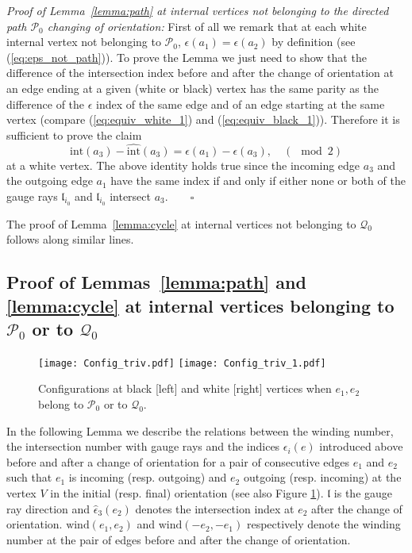 \documentclass[11pt]{amsart}
\theoremstyle{plain}
\numberwithin{equation}{section}
\begin{document}
\smallskip

{\sl Proof of Lemma~\ref{lemma:path} at internal vertices not belonging to the directed path $\mathcal P_0$ changing of orientation: } 
First of all we remark that at each white internal vertex not belonging to $\mathcal P_0$, $\epsilon(a_1)=\epsilon(a_2)$ by definition (see (\ref{eq:eps_not_path})). To prove the Lemma we just need to show that the difference of the intersection index before and after the change of orientation at an edge ending at a given (white or black) vertex has the same parity as the difference of the $\epsilon$ index of the same edge and of an edge starting at the same vertex (compare (\ref{eq:equiv_white_1}) and (\ref{eq:equiv_black_1})). Therefore it is sufficient to prove the claim 
\[
\mbox{int}(a_3) - \widehat{\mbox{int}}(a_3) = \epsilon(a_1) -\epsilon(a_3) , \quad (\!\!\!\!\!\!\mod 2)
\]
at a white vertex. The above identity holds true since the incoming edge $a_3$ and the outgoing edge $a_1$ have the same index if and only if either none or both of the gauge rays $\mathfrak{l}_{i_0}$ and $\mathfrak{l}_{i_0}$ intersect $a_3$.$\quad\quad \square$

The proof of Lemma~\ref{lemma:cycle} at internal vertices not belonging to $\mathcal Q_0$ follows along similar lines.

\subsection{Proof of Lemmas~\ref{lemma:path} and \ref{lemma:cycle} at internal vertices belonging to $\mathcal P_0$ or to $\mathcal Q_0$}

\begin{figure}
  \centering
  {\texttt{[image: Config\_triv.pdf]}}
	\hfill
	{\texttt{[image: Config\_triv\_1.pdf]}}
	\vspace{-2.3 truecm}
  \caption{Configurations at black [left] and white [right] vertices when $e_1,e_2$ belong to $\mathcal P_0$ or to $\mathcal Q_0$.}
	\label{fig:config_triv}
\end{figure}

In the following Lemma  we describe the relations between the winding number, the intersection number with gauge rays and the indices $\epsilon_i(e)$ introduced above before and after a change of orientation for a pair of consecutive edges $e_1$ and $e_2$ such that $e_1$ is incoming (resp. outgoing) and $e_2$ outgoing (resp. incoming) at the vertex $V$ in the initial (resp. final) orientation (see also Figure \ref{fig:config_triv}). $\mathfrak{l}$ is the gauge ray direction and $\hat\epsilon_3(e_2)$ denotes the intersection index at $e_2$ after the change of orientation. $\mbox{wind}(e_1,e_2)$ and $\mbox{wind}(-e_2,-e_1)$ respectively denote the winding number at the pair of edges before and after the change of orientation.
\end{document}
